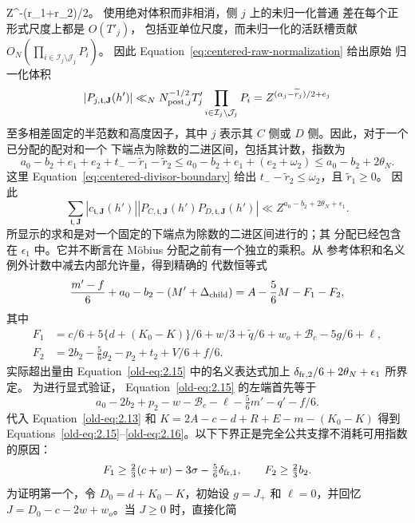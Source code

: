 \documentclass[11pt,a4paper]{article}
\numberwithin{equation}{section}
\numberwithin{figure}{section}
\theoremstyle{definition}
\theoremstyle{remark}
\begin{document}
 Z^{-(\widetilde r_1+\widetilde r_2)/2}\)。
使用绝对体积而非相消，侧 \(j\) 上的未归一化普通
差在每个正形式尺度上都是 \(O(T'_j)\)，
包括亚单位尺度，而未归一化的活跃槽贡献
\(O_N(\prod_{i\in\mathcal I_j\setminus\mathcal J_j}P_i)\)。
因此 Equation~\eqref{eq:centered-raw-normalization} 给出原始
归一化体积
\[
 |P_{j,\mathfrak t,\mathbf J}(h')|
 \ll_N N_{{\rm post},j}^{-1/2}T'_j
             \prod_{i\in\mathcal I_j\setminus\mathcal J_j}P_i
 =Z^{(\alpha_j-\widetilde r_j)/2+e_j}
\]
至多相差固定的半范数和高度因子，其中 \(j\) 表示其
\(C\) 侧或 \(D\) 侧。因此，对于一个已分配的配对和一个
下端点为除数的二进区间，包括其计数，指数为
\[
 a_0-b_2+e_1+e_2+t_- -\widetilde r_1-\widetilde r_2
 \le a_0-b_2+e_1+(e_2+\omega_2)
 \le a_0-b_2+2\theta_N.
\]
这里 Equation~\eqref{eq:centered-divisor-boundary} 给出
\(t_- -\widetilde r_2\le\omega_2\)，且 \(\widetilde r_1\ge0\)。
因此
\[
 \sum_{\mathfrak t,\mathbf J}
 |c_{\mathfrak t,\mathbf J}(h')|
 |P_{C,\mathfrak t,\mathbf J}(h')
       P_{D,\mathfrak t,\mathbf J}(h')|
 \ll Z^{a_0-b_2+2\theta_N+\epsilon_1}.
\]
所显示的求和是对一个固定的下端点为除数的二进区间进行的；其
分配已经包含在
\(\epsilon_1\) 中。它并不断言在
M\"obius 分配之前有一个独立的乘积。从
参考体积和名义例外计数中减去内部允许量，得到精确的
代数恒等式
\begin{equation}
 \frac{m'-f}{6}+a_0-b_2-(M'+\Delta_{\rm child})
 =A-\frac56M-F_1-F_2,
 \label{old-eq:2.15}
\end{equation}
其中
\begin{equation}
 \begin{aligned}
 F_1&=c/6+5\{d+(K_0-K)\}/6+w/3+\widetilde q/6
       +w_o+\mathcal B_c-5g/6+\ell,\\
 F_2&=2b_2-\tfrac56g_2-p_2+t_2+V/6+f/6.
 \end{aligned}
 \label{old-eq:2.16}
\end{equation}
实际超出量由
Equation~\eqref{old-eq:2.15} 中的名义表达式加上
\(\delta_{{\rm fr},2}/6+2\theta_N+\epsilon_1\) 所界定。
为进行显式验证，
Equation~\eqref{old-eq:2.15} 的左端首先等于
\[
 a_0-2b_2+p_2-w-\mathcal B_c-\ell
       -\tfrac56m'-q'-f/6.
\]
代入 Equation~\eqref{old-eq:2.13} 和
\(K=2A-c-d+R+E-m-(K_0-K)\) 得到
Equations~\eqref{old-eq:2.15}--\eqref{old-eq:2.16}。以下下界正是完全公共支撑不消耗可用指数的原因：
\begin{equation}
 F_1\ge\tfrac23(c+w)-3\sigma-\tfrac56\delta_{{\rm fr},1},\qquad
 F_2\ge\tfrac23b_2.
 \label{old-eq:2.17}
\end{equation}
为证明第一个，令 \(D_0=d+K_0-K\)，初始设
\(g=J_+\) 和 \(\ell=0\)，并回忆
\(J=D_0-c-2w+w_o\)。当 \(J\ge0\) 时，直接化简
\end{document}
